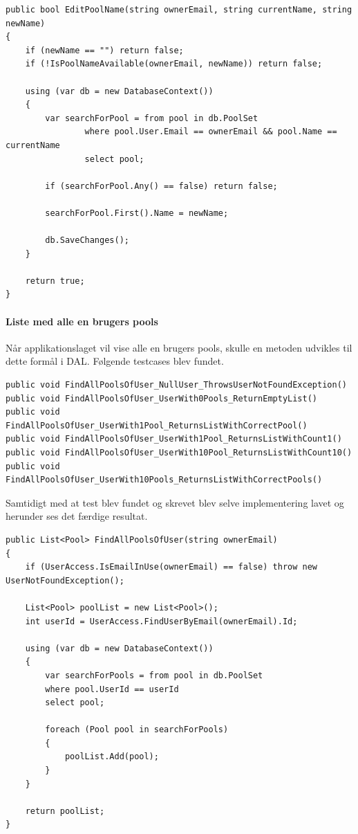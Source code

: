 \begin{lstlisting}[caption=Metoden EditPoolName]
public bool EditPoolName(string ownerEmail, string currentName, string newName)
{
	if (newName == "") return false;
	if (!IsPoolNameAvailable(ownerEmail, newName)) return false;
	
	using (var db = new DatabaseContext())
	{
		var searchForPool = from pool in db.PoolSet
				where pool.User.Email == ownerEmail && pool.Name == currentName
				select pool;
		
		if (searchForPool.Any() == false) return false;
		
		searchForPool.First().Name = newName;
		
		db.SaveChanges();
	}
	
	return true;
}
\end{lstlisting}

\paragraph{Liste med alle en brugers pools}

Når applikationslaget vil vise alle en brugers pools, skulle en metoden udvikles til dette formål i DAL. Følgende testcases blev fundet.

\begin{lstlisting}[caption=Testcases til FindAllPoolsOfUser metoden]
public void FindAllPoolsOfUser_NullUser_ThrowsUserNotFoundException()
public void FindAllPoolsOfUser_UserWith0Pools_ReturnEmptyList()
public void FindAllPoolsOfUser_UserWith1Pool_ReturnsListWithCorrectPool()
public void FindAllPoolsOfUser_UserWith1Pool_ReturnsListWithCount1()
public void FindAllPoolsOfUser_UserWith10Pool_ReturnsListWithCount10()
public void FindAllPoolsOfUser_UserWith10Pools_ReturnsListWithCorrectPools()
\end{lstlisting}

Samtidigt med at test blev fundet og skrevet blev selve implementering lavet og herunder ses det færdige resultat.

\begin{lstlisting}[caption=Metoden FindAllPoolsOfUser]
public List<Pool> FindAllPoolsOfUser(string ownerEmail)
{
	if (UserAccess.IsEmailInUse(ownerEmail) == false) throw new UserNotFoundException();
	
	List<Pool> poolList = new List<Pool>();
	int userId = UserAccess.FindUserByEmail(ownerEmail).Id;
	
	using (var db = new DatabaseContext())
	{
		var searchForPools = from pool in db.PoolSet
		where pool.UserId == userId
		select pool;
		
		foreach (Pool pool in searchForPools)
		{
			poolList.Add(pool);
		}
	}
	
	return poolList;
}
\end{lstlisting}

